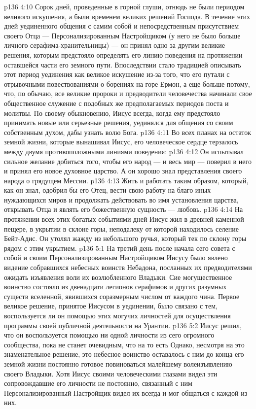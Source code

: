 \vs p136 4:10 \pc Сорок дней, проведенные в горной глуши, отнюдь не были периодом великого искушения, а были временем великих решений Господа. В течение этих дней уединенного общения с самим собой и непосредственным присутствием своего Отца --- Персонализированным Настройщиком (у него не было больше личного серафима\hyp{}хранительницы) --- он принял одно за другим великие решения, которым предстояло определять его линию поведения на протяжении оставшейся части его земного пути. Впоследствии стало традицией описывать этот период уединения как великое искушение из\hyp{}за того, что его путали с отрывочными повествованиями о борениях на горе Ермон, а еще больше потому, что, по обычаю, все великие пророки и предводители человечества начинали свое общественное служение с подобных же предполагаемых периодов поста и молитвы. По своему обыкновению, Иисус всегда, когда ему предстояло принимать новые или серьезные решения, уединялся для общения со своим собственным духом, дабы узнать волю Бога.
\vs p136 4:11 \pc Во всех планах на остаток земной жизни, которые вынашивал Иисус, его человеческое сердце терзалось между двумя противоположными линиями поведения:
\vs p136 4:12 \bibnobreakspace Он испытывал сильное желание добиться того, чтобы его народ --- и весь мир --- поверил в него и принял его новое духовное царство. А он хорошо знал представления своего народа о грядущем Мессии.
\vs p136 4:13 \bibnobreakspace Жить и работать таким образом, который, как он знал, одобрил бы его Отец, вести свою работу на благо иных нуждающихся миров и продолжать действовать во имя установления царства, открывать Отца и являть его божественную сущность --- любовь.
\vs p136 4:14 \pc На протяжении всех этих богатых событиями дней Иисус жил в древней каменной пещере, в укрытии в склоне горы, неподалеку от которой находилось селение Бейт\hyp{}Адис. Он утолял жажду из небольшого ручья, который тек по склону горы рядом с этим укрытием.
\vs p136 5:1 На третий день после начала сего совета с собой и своим Персонализированным Настройщиком Иисусу было явлено видение собравшихся небесных воинств Небадона, посланных их предводителями ожидать изъявления воли их возлюбленного Владыки. Сие могущественное воинство состояло из двенадцати легионов серафимов и других разумных существ вселенной, явившихся соразмерным числом от каждого чина. Первое великое решение, принятое Иисусом в уединении, было связано с тем, воспользуется ли он помощью этих могучих личностей для осуществления программы своей публичной деятельности на Урантии.
\vs p136 5:2 Иисус решил, что он  воспользуется помощью ни одной личности из сего огромного сообщества, пока не станет очевидным, что на то есть  Однако, несмотря на это знаменательное решение, это небесное воинство оставалось с ним до конца его земной жизни постоянно готовое повиноваться малейшему волеизъявлению своего Владыки. Хотя Иисус своими человеческими глазами видел эти сопровождавшие его личности не постоянно, связанный с ним Персонализированный Настройщик видел их всегда и мог общаться с каждой из них.
